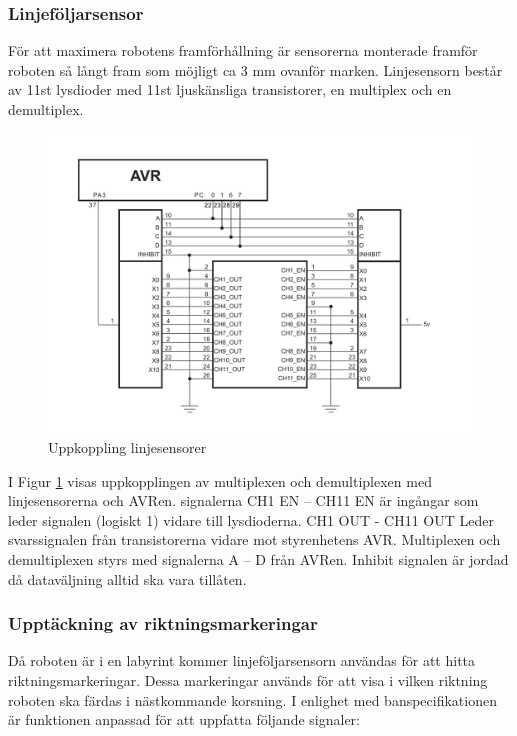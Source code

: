 \subsubsection{Linjeföljarsensor}
För att maximera robotens framförhållning är sensorerna monterade framför roboten 
så långt fram som möjligt ca 3 mm ovanför marken. Linjesensorn består av 11st lysdioder 
med 11st ljuskänsliga transistorer, en multiplex och en demultiplex.

\begin{figure}[H]
  \centering
 \includegraphics[angle=0,scale=0.5]{bilder/Uppkoppling_linjesensorer.pdf}
  \caption{Uppkoppling linjesensorer}
  \label{fig:Uppkoppling_linjesensorer}
\end{figure}


I Figur \ref{fig:Uppkoppling_linjesensorer} visas uppkopplingen av multiplexen och
demultiplexen  med linjesensorerna och AVRen. signalerna CH1 EN – CH11 EN 
är ingångar som leder signalen (logiskt 1) vidare till lysdioderna. 
CH1  OUT - CH11 OUT Leder svarssignalen från transistorerna vidare mot styrenhetens 
AVR. Multiplexen och demultiplexen styrs med signalerna A – D från AVRen. Inhibit 
signalen är jordad då dataväljning alltid ska vara tillåten.



\subsubsection{Upptäckning av riktningsmarkeringar}
\label{sec:riktmark}
Då roboten är i en labyrint kommer linjeföljarsensorn användas 
för att hitta riktningsmarkeringar. Dessa markeringar används för att visa i 
vilken riktning roboten ska färdas i nästkommande korsning.  I enlighet med 
banspecifikationen är funktionen anpassad för att uppfatta 
följande signaler:

